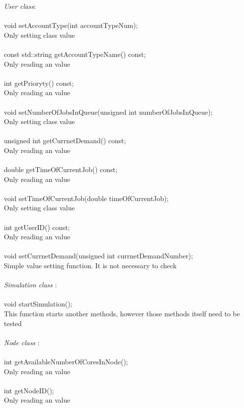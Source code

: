 \documentclass{scrreprt}
\begin{document}
\textit{User class}:
\\
\\
void setAccountType(int accountTypeNum);\\
Only setting class value
\\
\\
    const std::string getAccountTypeName() const;  \\
    Only reading an value
\\
\\
     int getPrioryty() const;  \\
     Only reading an value
\\
\\
  void setNumberOfJobsInQueue(unsigned int numberOfJobsInQueue);\\
  Only setting class value
\\
\\
   unsigned int getCurrnetDemand() const;\\
    Only reading an value
\\
\\
   double getTimeOfCurrentJob() const;\\
   Only reading an value
\\
\\
void setTimeOfCurrentJob(double timeOfCurrentJob);\\
Only setting class value
\\
\\
int getUserID() const;\\
 Only reading an value
\\
\\
    void setCurrnetDemand(unsigned int currnetDemandNumber);\\
    Simple value setting function. It is not necessary to check
\\
\\
 

 \textit{
Simulation class} :  
 \\
 \\
void startSimulation();\\
This function starts another methods, however those methods itself need to be tested
 \\
 \\
 \textit{
Node class} :  
 \\
 \\
 int getAvailableNumberOfCoresInNode();\\
 Only reading an value
\\
\\
 int getNodeID();\\
 Only reading an value
 \\
 \\
\end{document}
